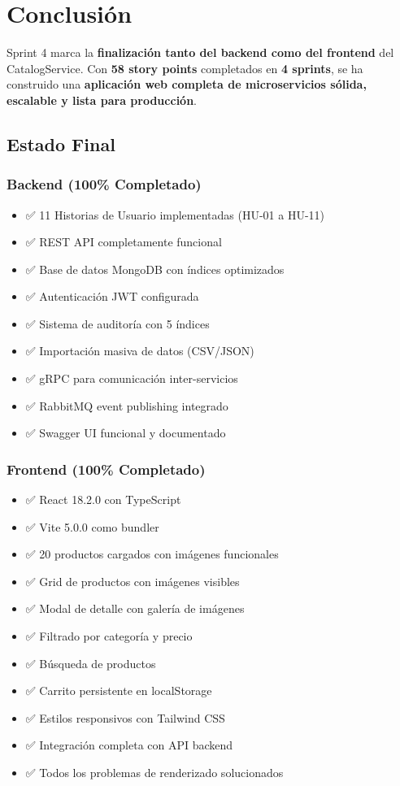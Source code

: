 \documentclass[12pt,a4paper]{article}
\begin{document}
\section{Conclusión}

Sprint 4 marca la \textbf{finalización tanto del backend como del frontend} del CatalogService. Con \textbf{58 story points} completados en \textbf{4 sprints}, se ha construido una \textbf{aplicación web completa de microservicios sólida, escalable y lista para producción}.

\subsection{Estado Final}

\subsubsection{Backend (100\% Completado)}

\begin{itemize}
    \item ✅ 11 Historias de Usuario implementadas (HU-01 a HU-11)
    \item ✅ REST API completamente funcional
    \item ✅ Base de datos MongoDB con índices optimizados
    \item ✅ Autenticación JWT configurada
    \item ✅ Sistema de auditoría con 5 índices
    \item ✅ Importación masiva de datos (CSV/JSON)
    \item ✅ gRPC para comunicación inter-servicios
    \item ✅ RabbitMQ event publishing integrado
    \item ✅ Swagger UI funcional y documentado
\end{itemize}

\subsubsection{Frontend (100\% Completado)}

\begin{itemize}
    \item ✅ React 18.2.0 con TypeScript
    \item ✅ Vite 5.0.0 como bundler
    \item ✅ 20 productos cargados con imágenes funcionales
    \item ✅ Grid de productos con imágenes visibles
    \item ✅ Modal de detalle con galería de imágenes
    \item ✅ Filtrado por categoría y precio
    \item ✅ Búsqueda de productos
    \item ✅ Carrito persistente en localStorage
    \item ✅ Estilos responsivos con Tailwind CSS
    \item ✅ Integración completa con API backend
    \item ✅ Todos los problemas de renderizado solucionados
\end{itemize}
\end{document}
